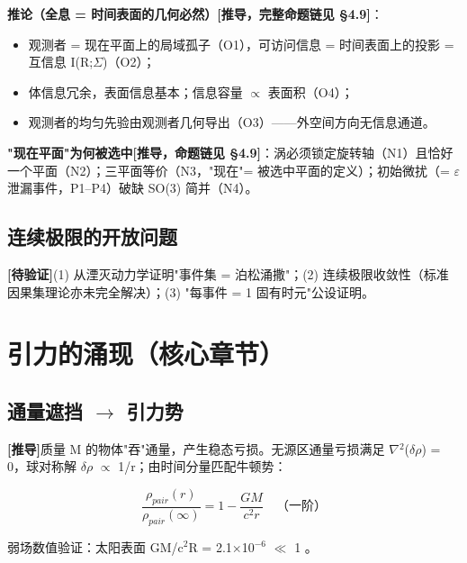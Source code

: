 \documentclass[UTF8,fontset=windows]{csoarticle}
\newcommand{\mtag}[1]{\textbf{[#1]}}
\newcommand{\up}[1]{\ensuremath{^{#1}}}
\begin{document}
\textbf{推论（全息 = 时间表面的几何必然）}\mtag{推导，完整命题链见 \S{}4.9}：
\begin{itemize}
\item 观测者 = 现在平面上的局域孤子（O1），可访问信息 = 时间表面上的投影 = 互信息 I(R;\ensuremath{\Sigma})（O2）；
\item 体信息冗余，表面信息基本；信息容量 \ensuremath{\propto} 表面积（O4）；
\item 观测者的均匀先验由观测者几何导出（O3）------外空间方向无信息通道。
\end{itemize}

\textbf{"现在平面"为何被选中}\mtag{推导，命题链见 \S{}4.9}：涡必须锁定旋转轴（N1）且恰好一个平面（N2）；三平面等价（N3，"现在"= 被选中平面的定义）；初始微扰（= \ensuremath{\varepsilon} 泄漏事件，P1--P4）破缺 SO(3) 简并（N4）。

\subsection{连续极限的开放问题}

\mtag{待验证}(1) 从湮灭动力学证明"事件集 = 泊松涌撒"；(2) 连续极限收敛性（标准因果集理论亦未完全解决）；(3) "每事件 = 1 固有时元"公设证明。



\section{引力的涌现（核心章节）}

\subsection{通量遮挡 \ensuremath{\to} 引力势}

\mtag{推导}质量 M 的物体"吞"通量，产生稳态亏损。无源区通量亏损满足 \ensuremath{\nabla}\up{2}(\ensuremath{\delta}\ensuremath{\rho}) = 0，球对称解 \ensuremath{\delta}\ensuremath{\rho} \ensuremath{\propto} 1/r；由时间分量匹配牛顿势：

\[\frac{\rho_{pair}(r)}{\rho_{pair}(\infty)} = 1 - \frac{GM}{c^2 r} \quad\text{（一阶）}\]

弱场数值验证：太阳表面 GM/c\up{2}R = 2.1\ensuremath{\times}10\up{-6} \ensuremath{\ll} 1 \checkmark。
\end{document}
